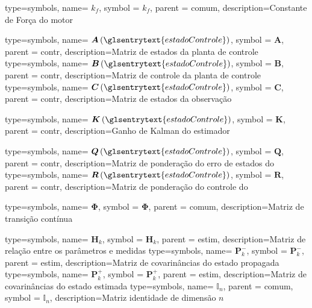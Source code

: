 {type=symbols,
  name= \ensuremath{k_f},
  symbol = \ensuremath{k_f},
parent = comum,
  description={Constante de Força do motor}
}


{type=symbols,
  name= \ensuremath{\boldsymbol{A}\left(\glsentrytext{estadoControle}\right)},
  symbol = \ensuremath{\boldsymbol{A}},
parent = contr,
  description={Matriz de estados da planta de controle}
}
{type=symbols,
  name= \ensuremath{\boldsymbol{B}\left(\glsentrytext{estadoControle}\right)},
  symbol = \ensuremath{\boldsymbol{B}},
parent = contr,
  description={Matriz de controle da planta de controle}
}
{type=symbols,
  name= \ensuremath{\boldsymbol{C}\left(\glsentrytext{estadoControle}\right)},
  symbol = \ensuremath{\boldsymbol{C}},
parent = contr,
  description={Matriz de estados da observação}
}

{type=symbols,
name= \ensuremath{\boldsymbol{K}\left(\glsentrytext{estadoControle}\right)},
symbol = \ensuremath{\boldsymbol{K}},
parent = contr,
  description={Ganho de Kalman do estimador}
}

{type=symbols,
  name= \ensuremath{\boldsymbol{Q}\left(\glsentrytext{estadoControle}\right)},
  symbol = \ensuremath{\boldsymbol{Q}},
parent = contr,
  description={Matriz de ponderação do erro de estados do }
}
{type=symbols,
  name= \ensuremath{\boldsymbol{R}\left(\glsentrytext{estadoControle}\right)},
  symbol = \ensuremath{\boldsymbol{R}},
parent = contr,
  description={Matriz de ponderação do controle do }
}


{type=symbols,
  name= \ensuremath{\boldsymbol{\Phi}},
  symbol = \ensuremath{\boldsymbol{\Phi}},
parent = comum,
  description={Matriz de transição contínua }
}

{type=symbols,
  name= \ensuremath{\mathbf{H}_{k}},
  symbol = \ensuremath{\mathbf{H}_{k}},
parent = estim,
  description={Matriz de relação entre os parâmetros e medidas}
}
{type=symbols,
  name= \ensuremath{\mathbf{P}_{k}^{-}},
  symbol = \ensuremath{\mathbf{P}_{k}^{-}},
parent = estim,
  description={Matriz de covarinâncias do estado propagada}
}
{type=symbols,
  name= \ensuremath{\mathbf{P}_{k}^{+}},
  symbol = \ensuremath{\mathbf{P}_{k}^{+}},
parent = estim,
  description={Matriz de covarinâncias do estado estimada}
}
{type=symbols,
  name= \ensuremath{\mathbb{I}_{n}},
parent = comum,
  symbol = \ensuremath{\mathbb{I}_{n}},
  description={Matriz identidade de dimensão \ensuremath{n}}
}


